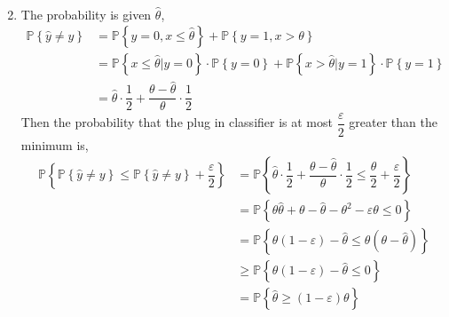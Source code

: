 \documentclass{article}
\begin{document}
\begin{enumerate}
\begin{align*}
\end{align*}
\item The probability is given $\hat{\theta}$,
\begin{align*}
\mathbb{P}\left\{\hat{y} \neq  y\right\} &= \mathbb{P}\left\{y = 0, x \leq  \hat{\theta}\right\} + \mathbb{P}\left\{y = 1, x > \theta\right\}
\\ &= \mathbb{P}\left\{x \leq  \hat{\theta} | y = 0\right\} \cdot  \mathbb{P}\left\{y = 0\right\} + \mathbb{P}\left\{x > \hat{\theta} | y = 1\right\} \cdot  \mathbb{P}\left\{y = 1\right\}
\\ &= \hat{\theta} \cdot  \dfrac{1}{2} + \dfrac{\theta - \hat{\theta}}{\theta} \cdot  \dfrac{1}{2}
\end{align*}
Then the probability that the plug in classifier is at most $\dfrac{\varepsilon}{2}$ greater than the minimum is,
\begin{align*}
\mathbb{P}\left\{\mathbb{P}\left\{\hat{y} \neq  y\right\} \leq  \mathbb{P}\left\{\hat{y} \neq  y\right\} + \dfrac{\varepsilon}{2}\right\} &= \mathbb{P}\left\{\hat{\theta} \cdot  \dfrac{1}{2} + \dfrac{\theta - \hat{\theta}}{\theta} \cdot  \dfrac{1}{2} \leq  \dfrac{\theta}{2} + \dfrac{\varepsilon}{2}\right\}
\\ &= \mathbb{P}\left\{\theta \hat{\theta} + \theta - \hat{\theta} - \theta^{2} - \varepsilon \theta \leq  0\right\}
\\ &= \mathbb{P}\left\{\theta \left(1 - \varepsilon\right) - \hat{\theta} \leq  \theta \left(\theta - \hat{\theta}\right)\right\}
\\ &\geq  \mathbb{P}\left\{\theta \left(1 - \varepsilon\right) - \hat{\theta} \leq  0\right\}
\\ &= \mathbb{P}\left\{\hat{\theta} \geq  \left(1 - \varepsilon\right) \theta\right\}
\end{align*}
\end{enumerate}
\end{document}
